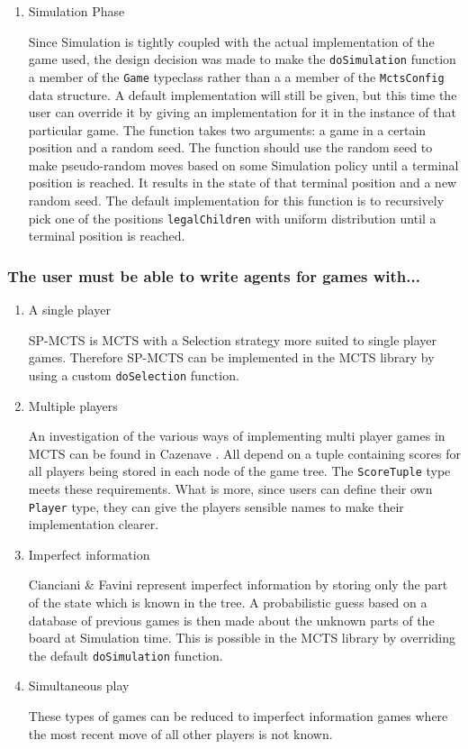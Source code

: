 \begin{enumerate}
\item Simulation Phase
\par
Since Simulation is tightly coupled with the actual implementation of the game used, the design decision was made to make the \verb|doSimulation| function a member of the \verb|Game| typeclass rather than a a member of the \verb|MctsConfig| data structure. A default implementation will still be given, but this time the user can override it by giving an implementation for it in the instance of that particular game. The function takes two arguments: a game in a certain position and a random seed. The function should use the random seed to make pseudo-random moves based on some Simulation policy until a terminal position is reached. It results in the state of that terminal position and a new random seed. The default implementation for this function is to recursively pick one of the positions \verb|legalChildren| with uniform distribution until a terminal position is reached.
\par 
\end{enumerate}

\subsubsection{The user must be able to write agents for games with...}
\begin{enumerate}
\item A single player
\par {SP-MCTS} is {MCTS} with a Selection strategy more suited to single player games. Therefore {SP-MCTS} can be implemented in the {MCTS} library by using a custom \texttt{doSelection} function.
\item Multiple players
\par An investigation of the various ways of implementing multi player games in {MCTS} can be found in Cazenave \cite{cazenave08}. All depend on a tuple containing scores for all players being stored in each node of the game tree. The \verb|ScoreTuple| type meets these requirements. What is more, since users can define their own \verb|Player| type, they can give the players sensible names to make their implementation clearer.

\item Imperfect information
\par Cianciani \& Favini \cite{kriegspiel} represent imperfect information by storing only the part of the state which is known in the tree. A probabilistic guess based on a database of previous games is then made about the unknown parts of the board at Simulation time. This is possible in the {MCTS} library by overriding the default \texttt{doSimulation} function.

\item Simultaneous play
\par These types of games can be reduced to imperfect information games where the most recent move of all other players is not known.
\end{enumerate}

